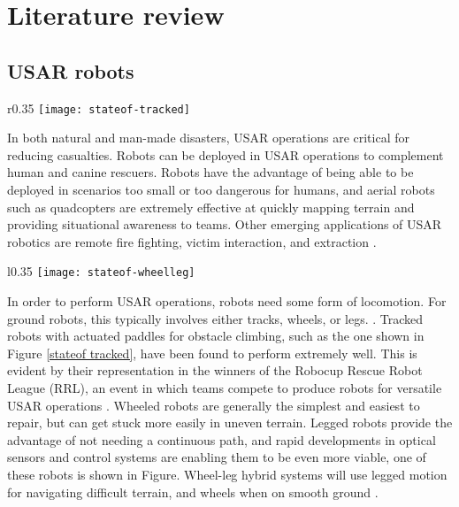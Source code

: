  \chapter{Literature review}

\section{USAR robots}

\begin{wrapfigure}{r}{0.35\textwidth} %
	\centering
	\texttt{[image: stateof-tracked]}
	\caption{A tracked USAR robot, with paddles for obstacle climbing \citep{stateof}.}
	\label{stateof tracked}
\end{wrapfigure}

In both natural and man-made disasters, USAR operations are critical for reducing casualties. Robots can be deployed in USAR operations to complement human and canine rescuers. Robots have the advantage of being able to be deployed in scenarios too small or too dangerous for humans, and aerial robots such as quadcopters are extremely effective at quickly mapping terrain and providing situational awareness to teams. Other emerging applications of USAR robotics are remote fire fighting, victim interaction, and extraction \citep{stateof}.\\
\begin{wrapfigure}{l}{0.35\textwidth} %
	\centering
	\texttt{[image: stateof-wheelleg]}
	\caption{ANYmal, a legged USAR robot \citep{stateof}.}
	\label{stateof wheelleg}
\end{wrapfigure}

In order to perform USAR operations, robots need some form of locomotion. For ground robots, this typically involves either tracks, wheels, or legs. \citep{stateof}. Tracked robots with actuated paddles for obstacle climbing, such as the one shown in Figure \ref{stateof tracked}, have been found to perform extremely well. This is evident by their representation in the winners of the Robocup Rescue Robot League (RRL), an event in which teams compete to produce robots for versatile USAR operations \citep{Sheh-2016}. Wheeled robots are generally the simplest and easiest to repair, but can get stuck more easily in uneven terrain. Legged robots provide the advantage of not needing a continuous path, and rapid developments in optical sensors and control systems are enabling them to be even more viable, one of these robots is shown in Figure. Wheel-leg hybrid systems will use legged motion for navigating difficult terrain, and wheels when on smooth ground \citep{stateof}. 
\newpage
